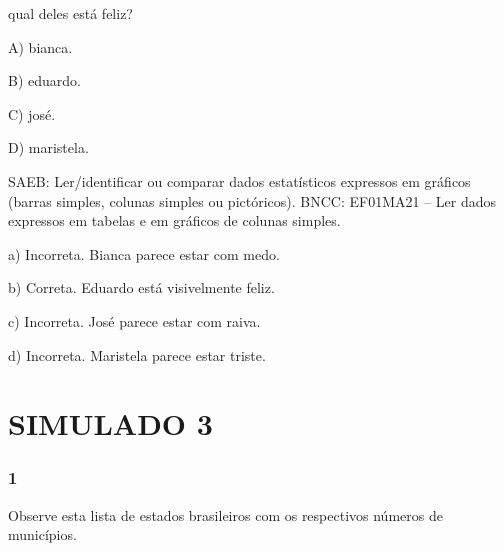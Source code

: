 qual deles está feliz?

A) bianca.

B) eduardo.

C) josé.

D) maristela.

SAEB: Ler/identificar ou comparar dados estatísticos expressos
em gráficos (barras simples, colunas simples ou pictóricos).
BNCC: EF01MA21 -- Ler dados expressos em tabelas e em gráficos de colunas
simples.

a) Incorreta. Bianca parece estar com medo.

b) Correta. Eduardo está visivelmente feliz.

c) Incorreta. José parece estar com raiva.

d) Incorreta. Maristela parece estar triste.

\section{SIMULADO 3}\label{simulado-3}

\subsubsection{1}\label{section-117}

Observe esta lista de estados brasileiros com os respectivos números de municípios.

